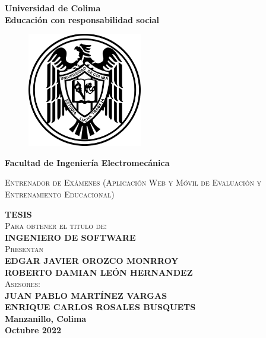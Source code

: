 \documentclass[12pt]{book}
\begin{document}
	    \begin{titlepage}
    	\begin{center}
    		{\huge \textbf{Universidad de Colima}}\\
    		\vspace{1mm}
    		{\Large \textbf{Educación con responsabilidad social}}
    		\vspace{1mm}
    		\begin{figure}[h]
    			\centering
    			\includegraphics[height=5cm]{./src/logoUcol.png}
    		\end{figure}
    		
    		{\LARGE \textbf{Facultad de Ingeniería Electromecánica}}\\ 
    		
    		\vspace{5mm}
 
    		\begin{spacing}{1}
    			{\LARGE \textsc{Entrenador de Exámenes (Aplicación Web y Móvil de Evaluación y Entrenamiento Educacional)} }
    		\end{spacing}
    		
    		\vspace{5mm}
    		
    		{\LARGE \textbf{TESIS}}\\
    		\vspace{2mm}
    		{\large \textsc{Para obtener el titulo de:}}\\
    		\vspace{3mm}
    		{\LARGE \textbf{INGENIERO DE SOFTWARE}}\\
    		\vspace{1cm}
    		{\Large \textsc{Presentan}}\\
    		\vspace{5mm}
    		{\large \textbf{EDGAR JAVIER OROZCO MONRROY}}\\
    	
    		{\large \textbf{ROBERTO DAMIAN LEÓN HERNANDEZ}}\\
    		\vspace{1cm}
    		{\Large \textsc{Asesores:}}\\
    		\vspace{5mm}
    		{\large \textbf{JUAN PABLO MARTÍNEZ VARGAS}}\\
    		{\large \textbf{ENRIQUE CARLOS ROSALES BUSQUETS}}\\
    		\vspace{3.5mm}
    		\vfill
    		{\Large \textbf{Manzanillo, Colima\\ Octubre 2022}}
    		
    	\end{center}
    \end{titlepage}
\end{document}
